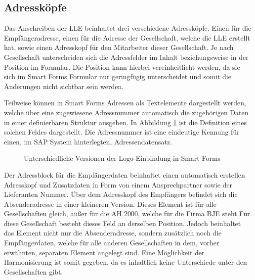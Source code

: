	\subsection{Adressköpfe}
	\label{ist:adr}
	
	Das Anschreiben der \ac{LLE} beinhaltet drei verschiedene Adressköpfe. Einen für die Empfängeradresse, einen für die Adresse der Gesellschaft, welche die \ac{LLE} erstellt hat, sowie einen Adresskopf für den Mitarbeiter dieser Gesellschaft. Je nach Gesellschaft unterscheiden sich die Adressfelder im Inhalt beziehungsweise in der Position im Formular. Die Position kann hierbei vereinheitlicht werden, da sie sich im Smart Forms Formular nur geringfügig unterscheidet und somit die Änderungen nicht sichtbar sein werden. 
	
	Teilweise können in Smart Forms Adressen als Textelemente dargestellt werden, welche über eine zugewiesene Adressnummer automatisch die zugehörigen Daten in einer definierbaren Struktur ausgeben. In Abbildung \ref{auto} ist die Definition eines solchen Feldes dargestellt. Die Adressnummer ist eine eindeutige Kennung für einen, im SAP System hinterlegten, Adressendatensatz.
			\begin{figure}[ht]
		\centering
		\caption{Unterschiedliche Versionen der Logo-Einbindung in Smart Forms}
		\label{auto}
	\end{figure} 
	
	 Der Adressblock für die Empfängerdaten beinhaltet einen automatisch erstellen Adresskopf und Zusatzdaten in Form von einem Ansprechpartner sowie der Lieferanten Nummer. Über dem Adresskopf des Empfängers befindet sich die Absenderadresse in einer kleineren Version. Dieses Element ist für alle Gesellschaften gleich, außer für die \ac{AH} 2000, welche für die Firma \ac{BJE} steht.Für diese Gesellschaft besteht dieses Feld an derselben Position. Jedoch beinhaltet das Element nicht nur die Absenderadresse, sondern zusätzlich noch die Empfängerdaten, welche für alle anderen Gesellschaften in dem, vorher erwähnten, separaten Element angelegt sind. Eine Möglichkeit der Harmonisierung ist somit gegeben, da es inhaltlich keine Unterschiede unter den Gesellschaften gibt.
	
